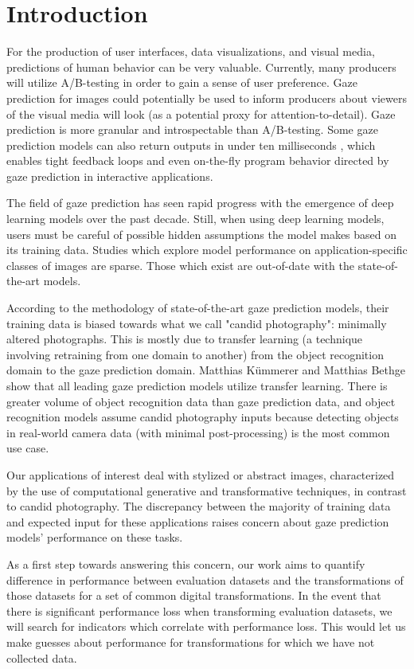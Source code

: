 \section{Introduction}
\label{sec:intro}

For the production of user interfaces, data visualizations, and visual media, predictions of human behavior can be very valuable. Currently, many producers will utilize A/B-testing in order to gain a sense of user preference. Gaze prediction for images could potentially be used to inform producers about viewers of the visual media will look (as a potential proxy for attention-to-detail). Gaze prediction is more granular and introspectable than A/B-testing. Some gaze prediction models can also return outputs in under ten milliseconds \cite{unisal}, which enables tight feedback loops and even on-the-fly program behavior directed by gaze prediction in interactive applications.

The field of gaze prediction has seen rapid progress with the emergence of deep learning models over the past decade. Still, when using deep learning models, users must be careful of possible hidden assumptions the model makes based on its training data. Studies which explore model performance on application-specific classes of images are sparse. Those which exist are out-of-date with the state-of-the-art models.

According to the methodology of state-of-the-art gaze prediction models, their training data is biased towards what we call "candid photography": minimally altered photographs. This is mostly due to transfer learning (a technique involving retraining from one domain to another) from the object recognition domain to the gaze prediction domain. Matthias Kümmerer and Matthias Bethge \cite{annurev-vision} show that all leading gaze prediction models utilize transfer learning. There is greater volume of object recognition data than gaze prediction data, and object recognition models assume candid photography inputs because detecting objects in real-world camera data (with minimal post-processing) is the most common use case.

Our applications of interest deal with stylized or abstract images, characterized by the use of computational generative and transformative techniques, in contrast to candid photography. The discrepancy between the majority of training data and expected input for these applications raises concern about gaze prediction models' performance on these tasks.

As a first step towards answering this concern, our work aims to quantify difference in performance between evaluation datasets and the transformations of those datasets for a set of common digital transformations. In the event that there is significant performance loss when transforming evaluation datasets, we will search for indicators which correlate with performance loss. This would let us make guesses about performance for transformations for which we have not collected data.